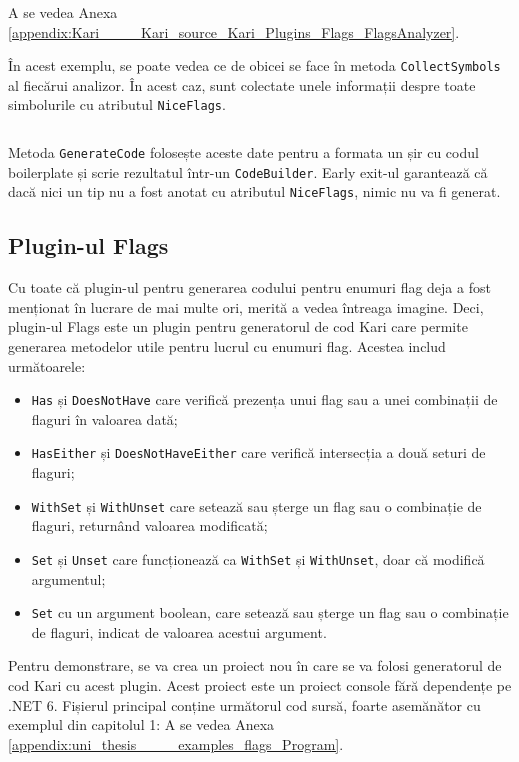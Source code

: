 \documentclass[a4paper,12pt]{report}
\begin{document}
A se vedea Anexa \ref{appendix:Kari____Kari_source_Kari_Plugins_Flags_FlagsAnalyzer}.

În acest exemplu, se poate vedea ce de obicei se face în metoda \texttt{CollectSymbols} al fiecărui analizor.
În acest caz, sunt colectate unele informații despre toate simbolurile cu atributul \texttt{NiceFlags}.
\inputminted[firstline=159, lastline=170]{cs}{../Kari/source/Kari.Plugins/Flags/FlagsAnalyzer.cs}

Metoda \texttt{GenerateCode\(\)} folosește aceste date pentru a formata un șir cu codul boilerplate și scrie rezultatul într-un \texttt{CodeBuilder}.
Early exit-ul garantează că dacă nici un tip nu a fost anotat cu atributul \texttt{NiceFlags}, nimic nu va fi generat.


\subsection{Plugin-ul Flags}

Cu toate că plugin-ul pentru generarea codului pentru enumuri flag deja a fost menționat în lucrare de mai multe ori, merită a vedea întreaga imagine.
Deci, plugin-ul Flags este un plugin pentru generatorul de cod Kari care permite generarea metodelor utile pentru lucrul cu enumuri flag.
Acestea includ următoarele:

\begin{itemize}
  \item \texttt{Has} și \texttt{DoesNotHave} care verifică prezența unui flag sau a unei combinații de flaguri în valoarea dată;
  \item \texttt{HasEither} și \texttt{DoesNotHaveEither} care verifică intersecția a două seturi de flaguri;
  \item \texttt{WithSet} și \texttt{WithUnset} care setează sau șterge un flag sau o combinație de flaguri, returnând valoarea modificată;
  \item \texttt{Set} și \texttt{Unset} care funcționează ca \texttt{WithSet} și \texttt{WithUnset}, doar că modifică argumentul;
  \item \texttt{Set} cu un argument boolean, care setează sau șterge un flag sau o combinație de flaguri, indicat de valoarea acestui argument.
\end{itemize}

Pentru demonstrare, se va crea un proiect nou în care se va folosi generatorul de cod Kari cu acest plugin.
Acest proiect este un proiect console fără dependențe pe .NET 6.
Fișierul principal conține următorul cod sursă, foarte asemănător cu exemplul din capitolul 1:
A se vedea Anexa \ref{appendix:uni_thesis____examples_flags_Program}.
\end{document}
